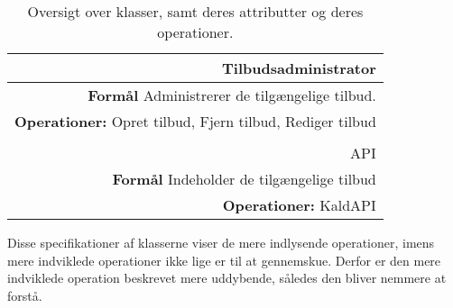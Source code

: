 \begin{table}[H]
\begin{tabularx}{\textwidth}{R}
\\
\hline
Tilbudsadministrator \\ \hline
\textbf{Formål} Administrerer de tilgængelige tilbud. \\ 
\textbf{Operationer:} Opret tilbud, Fjern tilbud, Rediger tilbud \\

\\
\hline
API \\ \hline 
\textbf{Formål} Indeholder de tilgængelige tilbud  \\
\textbf{Operationer:} KaldAPI\\

\end{tabularx}
\caption{Oversigt over klasser, samt deres attributter og deres operationer.}
\label{tab:designklasser}
\end{table}

Disse specifikationer af klasserne viser de mere indlysende operationer, imens mere indviklede operationer ikke lige er til at gennemskue. Derfor er den mere indviklede operation  beskrevet mere uddybende, således den bliver nemmere at forstå.

